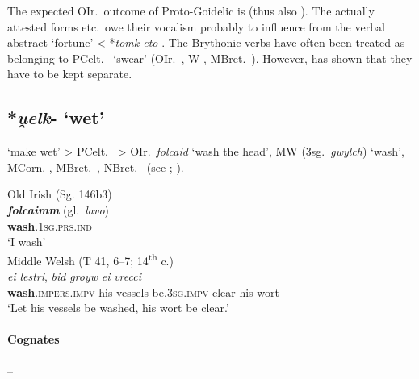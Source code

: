 \documentclass[output=paper,colorlinks,citecolor=brown]{langscibook}
\begin{document}
The expected OIr.\  outcome of Proto-Goidelic  is  (thus also \citealt{Schumacher1995}). The actually attested forms  etc.\ owe their vocalism probably to influence from the verbal abstract  ‘fortune’ < *\textit{tomk\nobreakdash-eto}-. The Brythonic verbs have often been treated as belonging to PCelt.\  ‘swear’ (OIr.\  , W , MBret.\ ). However, \citet{Schumacher1995} has shown that they have to be kept separate.

\subsection{*\textit{u̯elk}- ‘wet’}
\label{sec:Causwet}

 ‘make wet’ > PCelt.\  > OIr.\  \textit{folcaid}  ‘wash the head’, MW  (3sg.\ \textit{gwylch}) ‘wash’, MCorn. , MBret.\ , NBret.\  (see \citealt[141; 159--160]{Schulze-Thulin2001}; ).

\begin{exe}
    \ex Old Irish (Sg. 146b3)\label{ex:Causwet1}\\
        \gll \textbf{\textit{folcaimm}}  (gl.\ \textit{lavo}) \\
        \textbf{wash}.\textsc{1sg.prs.ind} \\
        \glt ‘I wash’\\
    \ex Middle Welsh (T 41, 6--7; 14\textsuperscript{th} c.) \label{ex:Causwet2}\\
         \textit{ei} \textit{lestri}, \textit{bid} \textit{groyw} \textit{ei} \textit{vrecci} \\
        \textbf{wash}.\textsc{impers.impv} his vessels be.\textsc{3sg.impv} clear his wort \\
        \glt ‘Let his vessels be washed, his wort be clear.’\\
\end{exe}

\paragraph*{Cognates}  -- 
\end{document}
